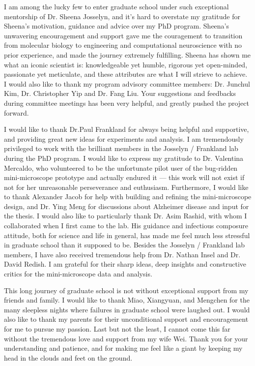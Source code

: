 I am among the lucky few to enter graduate school under such exceptional mentorship of Dr. Sheena Josselyn, and it's hard to overstate my gratitude for Sheena's motivation, guidance and advice over my PhD program. Sheena's unwavering encouragement and support gave me the couragement to transition from molecular biology to engineering and computational neuroscience with no prior experience, and made the journey extremely fulfilling. Sheena has shown me what an iconic scientist is: knowledgeable yet humble, rigorous yet open-minded, passionate yet meticulate, and these attributes are what I will strieve to achieve. I would also like to thank my program advisory committee members: Dr. Junchul Kim, Dr. Christopher Yip and Dr. Fang Liu. Your suggestions and feedbacks during committee meetings has been very helpful, and greatly pushed the project forward. 

I would like to thank Dr.Paul Frankland for always being helpful and supportive, and providing great new ideas for experiments and analysis. I am tremendously privileged to work with the brilliant members in the Josselyn \slash{} Frankland lab during the PhD program. I would like to express my gratitude to Dr. Valentina Mercaldo, who volunteered to be the unfortunate pilot user of the bug-ridden mini-microscope prototype and actually endured it --- this work will not exist if not for her unreasonable perseverance and euthusiasm. Furthermore, I would like to thank Alexander Jacob for help with building and refining the mini-microscope design, and Dr. Ying Meng for discussions about Alzheimer disease and input for the thesis. I would also like to particularly thank Dr. Asim Rashid, with whom I collaborated when I first came to the lab. His guidance and infectious composure attitude, both for science and life in general, has made me feel much less stressful in graduate school than it supposed to be. Besides the Josselyn \slash{} Frankland lab members, I have also received tremendous help from Dr. Nathan Insel and Dr. David Redish. I am grateful for their sharp ideas, deep insights and constructive critics for the mini-microscope data and analysis. 

This long journey of graduate school is not without exceptional support from my friends and family.  I would like to thank Miao, Xiangyuan, and Mengchen for the many sleepless nights where failures in graduate school were laughed out. I would also like to thank my parents for their unconditional support and encouragement for me to pursue my passion. Last but not the least, I cannot come this far without the tremendous love and support from my wife Wei. Thank you for your understanding and patience, and for making me feel like a giant by keeping my head in the clouds and feet on the ground. 



